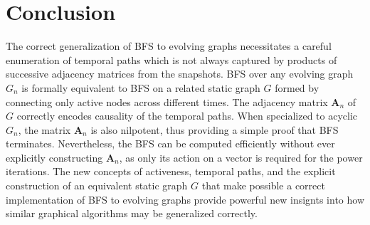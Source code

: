 \documentclass[10pt,conference,compsocconf]{IEEEtran}
\theoremstyle{definition}
\begin{document}




\section{Conclusion}

The correct generalization of BFS to evolving graphs necessitates a careful
enumeration of temporal paths which is not always captured by products of
successive adjacency matrices from the snapshots. BFS over any evolving graph $G_n$
is formally equivalent to BFS on a related static graph $G$ formed by connecting only
active nodes across different times. The adjacency matrix $\bm A_n$ of $G$ correctly
encodes causality of the temporal paths. When specialized to acyclic $G_n$, the matrix
$\bm A_n$ is also nilpotent, thus providing a simple proof that BFS terminates.
Nevertheless, the BFS can be computed efficiently without ever explicitly constructing
$\bm A_n$, as only its action on a vector is required for the power iterations.
The new concepts of activeness, temporal paths, and the explicit construction of
an equivalent static graph $G$ that make possible a correct implementation of BFS
to evolving graphs provide powerful new insignts into how similar graphical
algorithms may be generalized correctly.

\end{document}

